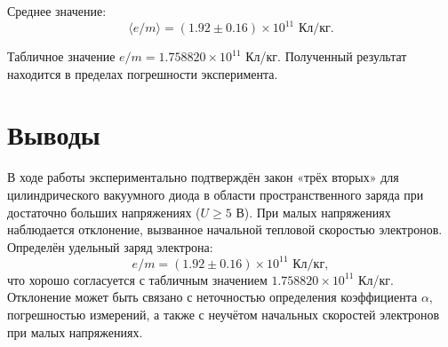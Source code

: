 \documentclass[a4paper]{article}
\begin{document}
	Среднее значение:
	\[
	\langle e/m \rangle = (1.92 \pm 0.16) \times 10^{11} \text{ Кл/кг}.
	\]
	
	Табличное значение $e/m = 1.758820 \times 10^{11}$ Кл/кг. Полученный результат находится в пределах погрешности эксперимента.
	
	\section{Выводы}
	
	В ходе работы экспериментально подтверждён закон «трёх вторых» для цилиндрического вакуумного диода в области пространственного заряда при достаточно больших напряжениях ($U \ge 5$ В). При малых напряжениях наблюдается отклонение, вызванное начальной тепловой скоростью электронов. Определён удельный заряд электрона:
	\[
	e/m = (1.92 \pm 0.16) \times 10^{11} \text{ Кл/кг},
	\]
	что хорошо согласуется с табличным значением $1.758820 \times 10^{11}$ Кл/кг. Отклонение может быть связано с неточностью определения коэффициента $\alpha$, погрешностью измерений, а также с неучётом начальных скоростей электронов при малых напряжениях.
	
\end{document}
